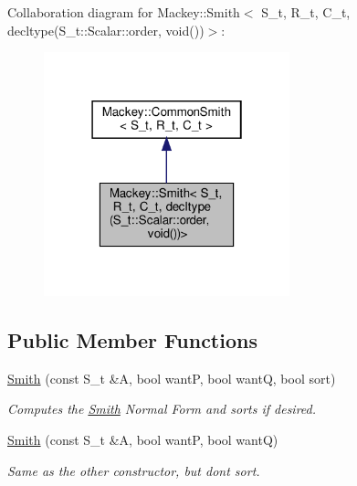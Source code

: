 Collaboration diagram for Mackey\+:\+:Smith$<$ S\+\_\+t, R\+\_\+t, C\+\_\+t, decltype(S\+\_\+t\+:\+:Scalar\+:\+:order, void())$>$\+:\nopagebreak
\begin{figure}[H]
\begin{center}
\leavevmode
\includegraphics[width=202pt]{classMackey_1_1Smith_3_01S__t_00_01R__t_00_01C__t_00_01decltype_07S__t_1_1Scalar_1_1order_00_01void_07_08_08_4__coll__graph}
\end{center}
\end{figure}
\subsection*{Public Member Functions}
\begin{DoxyCompactItemize}
\item 
\hyperlink{classMackey_1_1Smith_3_01S__t_00_01R__t_00_01C__t_00_01decltype_07S__t_1_1Scalar_1_1order_00_01void_07_08_08_4_a248f8208745c2cddd880a40694a6a64c}{Smith} (const S\+\_\+t \&A, bool wantP, bool wantQ, bool sort)
\begin{DoxyCompactList}\small\item\em Computes the \hyperlink{classMackey_1_1Smith}{Smith} Normal Form and sorts if desired. \end{DoxyCompactList}\item 
\hyperlink{classMackey_1_1Smith_3_01S__t_00_01R__t_00_01C__t_00_01decltype_07S__t_1_1Scalar_1_1order_00_01void_07_08_08_4_ad4bdf593897252b89ec2a835d155dec0}{Smith} (const S\+\_\+t \&A, bool wantP, bool wantQ)
\begin{DoxyCompactList}\small\item\em Same as the other constructor, but don\textquotesingle{}t sort. \end{DoxyCompactList}\end{DoxyCompactItemize}


